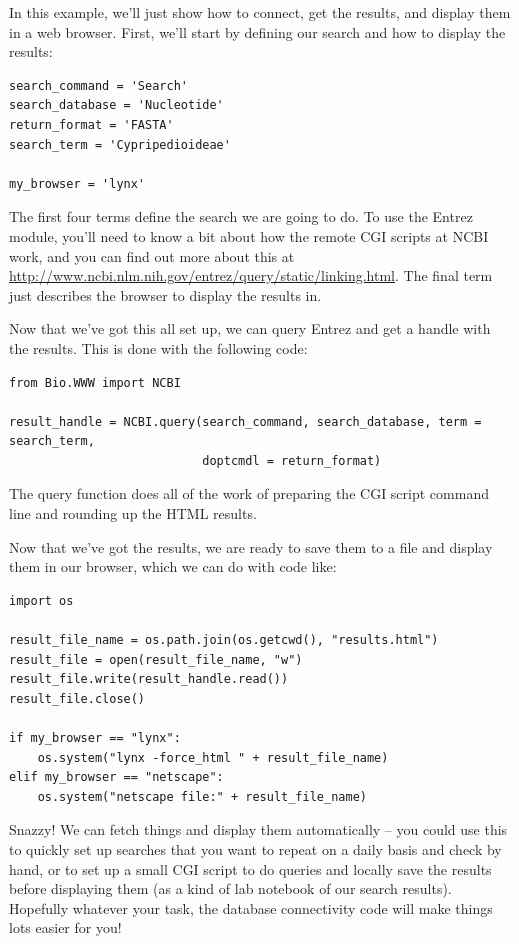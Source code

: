 \documentclass{report}
\begin{document}
In this example, we'll just show how to connect, get the results, and display them in a web browser. First, we'll start by defining our search and how to display the results:

\begin{verbatim}
search_command = 'Search'
search_database = 'Nucleotide'
return_format = 'FASTA'
search_term = 'Cypripedioideae'

my_browser = 'lynx'
\end{verbatim}

The first four terms define the search we are going to do. To use the Entrez module, you'll need to know a bit about how the remote CGI scripts at NCBI work, and you can find out more about this at \url{http://www.ncbi.nlm.nih.gov/entrez/query/static/linking.html}. The final term just describes the browser to display the results in.


Now that we've got this all set up, we can query Entrez and get a handle with the results. This is done with the following code:

\begin{verbatim}
from Bio.WWW import NCBI

result_handle = NCBI.query(search_command, search_database, term = search_term,
                           doptcmdl = return_format)
\end{verbatim}

The query function does all of the work of preparing the CGI script command line and rounding up the HTML results.


Now that we've got the results, we are ready to save them to a file and display them in our browser, which we can do with code like:

\begin{verbatim}
import os

result_file_name = os.path.join(os.getcwd(), "results.html")
result_file = open(result_file_name, "w")
result_file.write(result_handle.read())
result_file.close()

if my_browser == "lynx":
    os.system("lynx -force_html " + result_file_name)
elif my_browser == "netscape":
    os.system("netscape file:" + result_file_name)
\end{verbatim}

Snazzy! We can fetch things and display them automatically -- you could use this to quickly set up searches that you want to repeat on a daily basis and check by hand, or to set up a small CGI script to do queries and locally save the results before displaying them (as a kind of lab notebook of our search results). Hopefully whatever your task, the database connectivity code will make things lots easier for you!
\end{document}
